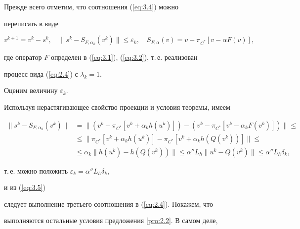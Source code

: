 \begin{pf}


Прежде всего отметим, что соотношения (\ref{eq:3.4}) можно 


переписать в виде


\begin{equation} \label{eq:3.7} 


v^{k+1}=v^{k} - s^{k},\quad


\| s^{k} - S_{F, \alpha_{k}} (v^{k}) \| \leq \varepsilon_{k}, \quad


S_{F, \alpha} (v)=v - \pi_{C^*} [v - \alpha F(v)], 


\end{equation}


где оператор $F$ определен в (\ref{eq:3.1}), (\ref{eq:3.2}), т.\,е. реализован 


процесс вида (\ref{eq:2.4}) с $\lambda_{k}=1$.


Оценим величину $ \varepsilon_{k}$. 


Используя нерастягивающее свойство проекции и условия теоремы, имеем 


\begin{align*}


\|s^{k}-S_{F, \alpha_{k}}(v^{k}) \| &=\|(v^{k}-\pi_{C^*}


[v^{k}+\alpha_{k}h(u^{k})]) -


(v^{k} - \pi_{C^*} [v^{k} - \alpha_{k}F(v^{k})]) \|\le \\


%


&\leq \| \pi_{C^*} [v^{k}+\alpha_{k}h(u^{k})] -


\pi_{C^*} [v^{k}+\alpha_{k}h(Q(v^{k}))] \|\le \\


%


&\leq \alpha_{k} \| h(u^{k}) - h(Q (v^{k})) \| \leq


\alpha'' L_{h} \| u^{k} - Q(v^{k}) \| 


\leq \alpha'' L_{h} \delta_{k}, 


\end{align*}


т.\,е. можно положить $\varepsilon_{k}=\alpha'' L_{h} \delta_{k}$,


и из (\ref{eq:3.5}) 


следует выполнение третьего соотношения в (\ref{eq:2.4}). Покажем, что 


выполняются остальные условия предложения \ref{pro:2.2}. В самом деле, 



\end{pf}
